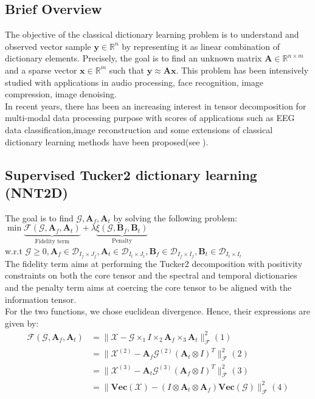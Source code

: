\documentclass{article}
\def\F{{\mathcal F}}
\def\X{\boldsymbol{{\mathscr X}}}
\def\G{\boldsymbol{{\mathscr G}}}
\def\A{{\mathbf A}}
\def\B{{\mathbf B}}
\begin{document}
 \subsection{Brief Overview}
 The objective of the classical dictionary learning problem is to understand and observed vector sample $\mathbf{y}\in\mathbb{R}^{n}$ by representing it as linear combination of dictionary elements. Precisely, the goal is to find an unknown matrix $\A\in\mathbb{R}^{n\times m}$ and a sparse vector $\mathbf{x}\in\mathbb{R}^{m}$ such that $\mathbf{y}\approx \A\mathbf{x}$. This problem has been intensively studied with applications in audio processing\cite{DictionaryOverview}, face recognition\cite{DictionaryOverview}, image compression\cite{DictionaryOverview}, image denoising\cite{DictionaryOverview}.\\
 In recent years, there has been an increasing interest in tensor decomposition for multi-modal data processing purpose with scores of applications such as EEG data classification\cite{TensorDictionary2},image reconstruction\cite{TensorDictionary2} and some extensions of classical dictionary learning methods have been proposed(see \cite{TensorDictionary2,TensorDictionry1,TDL2}). 
 
 \subsection{Supervised Tucker2 dictionary learning (NNT2D)}
 The goal is to find $\G,\A_{f},\A_{t}$ by solving the following problem:
\\ 
$\min \underbrace{ \mathcal{F}(\G,\A_{f},\A_{t})}_{\text{Fidelity term}}+\lambda \underbrace{\xi(\G,\B_{f},\B_{t})}_{\text{Penalty}}$\\
w.r.t $\G\geq 0,\A_{f}\in \mathcal{D}_{I_{f}\times J_{f}},\A_{t}\in \mathcal{D}_{I_{t}\times J_{t}},\B_{f}\in \mathcal{D}_{I_{f}\times I_{f}},\B_{t}\in \mathcal{D}_{I_{t}\times I_{t}}$\\
 The fidelity term aims at performing the Tucker2 decomposition with positivity constraints on both the core tensor and the spectral and temporal dictionaries and the penalty term aims at coercing the core tensor to be aligned with the information tensor.\\
 For the two functions, we chose euclidean divergence. Hence, their expressions are given by:\\
$$
\begin{aligned}
\mathcal{F}(\G,\A_{f},\A_{t}) &=\| \X - \G \times_1 I \times_2 \A_f  \times_3 \A_t \|_{\F}^2(1)\\
&=\| \X^{(2)} - \A_f \G^{(2)}(\A_t\otimes I)^{T} \|_{\F}^2(2)\\
&=\| \X^{(3)} - \A_t \G^{(3)}(\A_f\otimes I)^{T} \|_{\F}^2(3)\\
&=\| \textbf{Vec}(\X)-(I\otimes \A_t \otimes\A_f)\textbf{Vec}(\G)\|_{\F}^2(4)
\end{aligned}
$$
\end{document}
